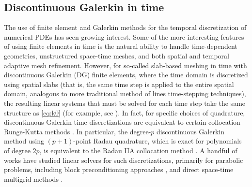 \documentclass[review]{siamart}
\begin{document}
\subsection{Discontinuous Galerkin in time}\label{sec:intro:dg}

The use of finite element and Galerkin methods for the temporal discretization of numerical PDEs has seen growing interest.
Some of the more interesting features of using finite elements in time is the natural ability to handle time-dependent geometries, unstructured space-time meshes, and both spatial and temporal adaptive mesh refinement.
However, for so-called slab-based meshing in time with discontinuous Galerkin (DG) finite elements, where the time domain is discretized using spatial slabs (that is, the same time step is applied to the entire spatial domain, analogous to more traditional method of lines time-stepping techniques), the resulting linear systems that must be solved for each time step take the same structure as \eqref{eq:k0} (for example, see \cite{hn,Akrivis2011}).
In fact, for specific choices of quadrature, discontinuous Galerkin time discretizations are equivalent to certain collocation Runge-Kutta methods \cite{Lasaint1974}.
In particular, the degree-$p$ discontinuous Galerkin method using $(p+1)$-point Radau quadrature, which is exact for polynomials of degree $2p$, is equivalent to the Radau IIA collocation method \cite{Makridakis2006}.
A handful of works have studied linear solvers for such discretizations, primarily for parabolic problems, including block preconditioning approaches \cite{exh,8jp,27n}, and direct space-time multigrid methods \cite{gander2016analysis}.
\end{document}
